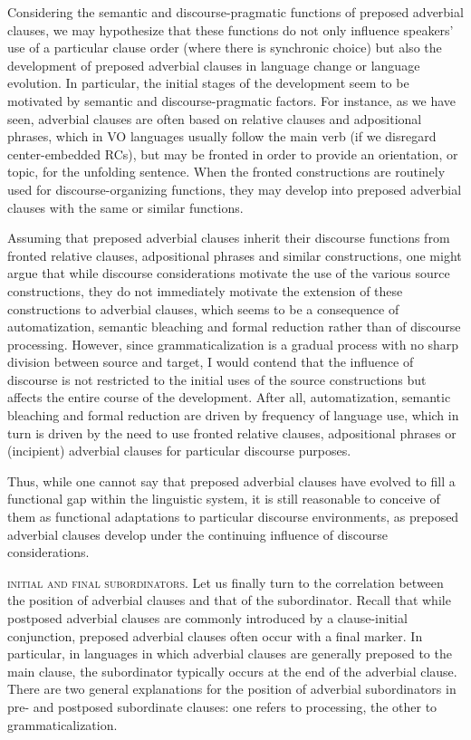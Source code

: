 \documentclass[output=paper]{langsci/langscibook}
\begin{document}
Considering the semantic and discourse-pragmatic functions of preposed adverbial clauses, we may hypothesize that these functions do not only influence speakers’ use of a particular clause order (where there is synchronic choice) but also the development of preposed adverbial clauses in language change or language evolution. In particular, the initial stages of the development seem to be motivated by semantic and discourse-pragmatic factors. For instance, as we have seen, adverbial clauses are often based on relative clauses and adpositional phrases, which in VO languages usually follow the main verb (if we disregard center-embedded RCs), but may be fronted in order to provide an orientation, or topic, for the unfolding sentence. When the fronted constructions are routinely used for discourse-organizing functions, they may develop into preposed adverbial clauses with the same or similar functions. 

Assuming that preposed adverbial clauses inherit their discourse functions from fronted relative clauses, adpositional phrases and similar constructions, one might argue that while discourse considerations motivate the use of the various source constructions, they do not immediately motivate the extension of these constructions to adverbial clauses, which seems to be a consequence of automatization, semantic bleaching and formal reduction rather than of discourse processing. However, since grammaticalization is a gradual process with no sharp division between source and target, I would contend that the influence of discourse is not restricted to the initial uses of the source constructions but affects the entire course of the development. After all, automatization, semantic bleaching and formal reduction are driven by frequency of language use, which in turn is driven by the need to use fronted relative clauses, adpositional phrases or (incipient) adverbial clauses for particular discourse purposes.

Thus, while one cannot say that preposed adverbial clauses have evolved to fill a functional gap within the linguistic system, it is still reasonable to conceive of them as functional adaptations to particular discourse environments, as preposed adverbial clauses develop under the continuing influence of discourse considerations.

\textsc{initial} \textsc{and} \textsc{final} \textsc{subordinators}. Let us finally turn to the correlation between the position of adverbial clauses and that of the subordinator. Recall that while postposed adverbial clauses are commonly introduced by a clause-initial conjunction, preposed adverbial clauses often occur with a final marker. In particular, in languages in which adverbial clauses are generally preposed to the main clause, the subordinator typically occurs at the end of the adverbial clause. There are two general explanations for the position of adverbial subordinators in pre- and postposed subordinate clauses: one refers to processing, the other to grammaticalization.
\end{document}
